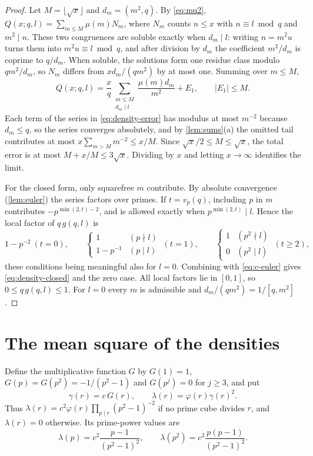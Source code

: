 \begin{proof}
Let $M=\lfloor\sqrt x\rfloor$ and $d_m=(m^2,q)$. By \eqref{eq:mu2}, $Q(x;q,l)=\sum_{m\le M}\mu(m)N_m$, where $N_m$ counts $n\le x$ with $n\equiv l\bmod q$ and $m^2\mid n$. These two congruences are soluble exactly when $d_m\mid l$: writing $n=m^2u$ turns them into $m^2u\equiv l\bmod q$, and after division by $d_m$ the coefficient $m^2/d_m$ is coprime to $q/d_m$. When soluble, the solutions form one residue class modulo $qm^2/d_m$, so $N_m$ differs from $xd_m/(qm^2)$ by at most one. Summing over $m\le M$,
\[
Q(x;q,l)=\frac xq\sum_{\substack{m\le M\\d_m\mid l}}\frac{\mu(m)d_m}{m^2}+E_1,\qquad|E_1|\le M.
\]
Each term of the series in \eqref{eq:density-error} has modulus at most $m^{-2}$ because $d_m\le q$, so the series converges absolutely, and by \cref{lem:sums}(a) the omitted tail contributes at most $x\sum_{m>M}m^{-2}\le x/M$. Since $\sqrt x/2\le M\le\sqrt x$, the total error is at most $M+x/M\le3\sqrt x$. Dividing by $x$ and letting $x\to\infty$ identifies the limit.

For the closed form, only squarefree $m$ contribute. By absolute convergence (\cref{lem:euler}) the series factors over primes. If $t=v_p(q)$, including $p$ in $m$ contributes $-p^{\min(2,t)-2}$, and is allowed exactly when $p^{\min(2,t)}\mid l$. Hence the local factor of $q\,g(q,l)$ is
\[
1-p^{-2}\ (t=0),\qquad
\begin{cases}1&(p\nmid l)\\1-p^{-1}&(p\mid l)\end{cases}\ (t=1),\qquad
\begin{cases}1&(p^2\nmid l)\\0&(p^2\mid l)\end{cases}\ (t\ge2),
\]
these conditions being meaningful also for $l=0$. Combining with \eqref{eq:c-euler} gives \eqref{eq:density-closed} and the zero case. All local factors lie in $[0,1]$, so $0\le q\,g(q,l)\le1$. For $l=0$ every $m$ is admissible and $d_m/(qm^2)=1/[q,m^2]$.
\end{proof}

\section{The mean square of the densities}

Define the multiplicative function $G$ by $G(1)=1$, $G(p)=G(p^2)=-1/(p^2-1)$ and $G(p^j)=0$ for $j\ge3$, and put
\begin{equation}\label{eq:lambda}
\gamma(r)=c\,G(r),\qquad\lambda(r)=\varphi(r)\gamma(r)^2.
\end{equation}
Thus $\lambda(r)=c^2\varphi(r)\prod_{p\mid r}(p^2-1)^{-2}$ if no prime cube divides $r$, and $\lambda(r)=0$ otherwise. Its prime-power values are
\begin{equation}\label{eq:lambda-p}
\lambda(p)=c^2\frac{p-1}{(p^2-1)^2},\qquad\lambda(p^2)=c^2\frac{p(p-1)}{(p^2-1)^2}.
\end{equation}

